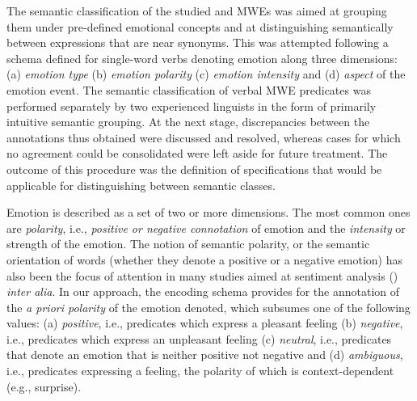 \documentclass[output=paper]{langsci/langscibook}
\begin{document}

The semantic classification of the studied  and  MWEs  was aimed at
grouping them under pre-defined emotional concepts and at
distinguishing semantically between expressions that are near synonyms.
This was attempted following a schema defined for single-word  verbs
denoting emotion \citep{giouli2012}  along three dimensions:
(a) \textit{emotion type} (b)  \textit{emotion
polarity} (c) \textit{emotion intensity}  and (d)
\textit{aspect} of the emotion event. The semantic
classification of verbal MWE predicates was performed separately by two
experienced linguists in the form of primarily intuitive semantic
grouping. At the next stage, discrepancies between the annotations thus
obtained were discussed and resolved, whereas cases for which no
agreement could be consolidated were left aside for future treatment.
The outcome of this procedure was the definition of specifications that
would be applicable for distinguishing between semantic classes.


Emotion is described as a set of two or more dimensions. The most common
ones are \textit{polarity}, i.e., \textit{positive
or negative connotation} of emotion and the
\textit{intensity} or strength of the emotion. The notion of
semantic polarity, or the semantic orientation of words (whether
they denote a positive or a negative emotion) has also been the focus of
attention in many studies aimed at sentiment analysis (\citealt{esuli2006,wilson2005}) \textit{inter alia}. In our approach, the
encoding schema provides for the annotation of the \textit{a
priori polarity} of the emotion denoted, which subsumes one of the
following values: (a) \textit{positive}, i.e., predicates
which express a pleasant feeling (b) \textit{negative},
i.e., predicates which express an unpleasant feeling (c)
\textit{neutral}, i.e., predicates that denote an emotion
that is neither positive not negative and (d)
\textit{ambiguous}, i.e., predicates expressing a feeling,
the polarity of which is context-dependent (e.g., surprise).
\end{document}
